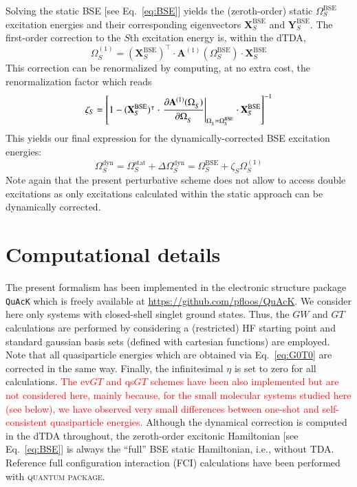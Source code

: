 \documentclass[aip,jcp,reprint,noshowkeys,superscriptaddress]{revtex4-1}
\newcommand{\alert}[1]{\textcolor{red}{#1}}
\newcommand{\QP}{\textsc{quantum package}}
\newcommand{\T}[1]{#1^{\intercal}}
\newcommand{\BSE}{\text{BSE}}
\newcommand{\Om}[2]{\Omega_{#1}^{#2}}
\newcommand{\bA}[2]{\mathbf{A}_{#1}^{#2}}
\newcommand{\bX}[2]{\mathbf{X}_{#1}^{#2}}
\newcommand{\bY}[2]{\mathbf{Y}_{#1}^{#2}}
\begin{document}
Solving the static BSE [see Eq.~\eqref{eq:BSE}] yields the (zeroth-order) static $\Om{S}{\BSE}$ excitation energies and their corresponding eigenvectors $\bX{S}{\BSE}$ and $\bY{S}{\BSE}$. 
The first-order correction to the $S$th excitation energy is, within the dTDA,
\begin{equation}
\label{eq:Om1-TDA}
	\Om{S}{(1)} = \T{(\bX{S}{\BSE})} \cdot \bA{}{(1)}(\Om{S}{\BSE}) \cdot \bX{S}{\BSE}
\end{equation}
This correction can be renormalized by computing, at no extra cost, the renormalization factor which reads
\begin{equation}
\label{eq:Z}
	\zeta_{S} = \qty[ 1 - \T{(\bX{S}{\BSE})} \cdot \eval{\pdv{\bA{}{(1)}(\Om{S}{})}{\Om{S}{}}}_{\Om{S}{} = \Om{S}{\BSE}} \cdot \bX{S}{\BSE} ]^{-1}
\end{equation}
This yields our final expression for the dynamically-corrected BSE excitation energies:
\begin{equation}
	\Om{S}{\text{dyn}} = \Om{S}{\text{stat}} + \Delta\Om{S}{\text{dyn}} = \Om{S}{\BSE} + \zeta_{S} \Om{S}{(1)}
\end{equation}
Note again that the present perturbative scheme does not allow to access double excitations as only excitations calculated within the static approach can be dynamically corrected.

\section{Computational details}
\label{sec:compdet}
The present formalism has been implemented in the electronic structure package \texttt{QuAcK} \cite{QuAcK} which is freely available at \url{https://github.com/pfloos/QuAcK}. 
We consider here only systems with closed-shell singlet ground states. 
Thus, the $GW$ and $GT$ calculations are performed by considering a (restricted) HF starting point and standard gaussian basis sets (defined with cartesian functions) are employed.
Note that all quasiparticle energies which are obtained via Eq.~\eqref{eq:G0T0} are corrected in the same way.
Finally, the infinitesimal $\eta$ is set to zero for all calculations.
\alert{The ev$GT$ and qs$GT$ schemes have been also implemented but are not considered here, mainly because, for the small molecular systems studied here (see below), we have observed very small differences between one-shot and self-consistent quasiparticle energies.}
Although the dynamical correction is computed in the dTDA throughout, the zeroth-order excitonic Hamiltonian [see Eq.~\eqref{eq:BSE}] is always the ``full'' BSE static Hamiltonian, i.e., without TDA. 
Reference full configuration interaction (FCI) calculations have been performed with {\QP}. \cite{Garniron_2019}
\end{document}
